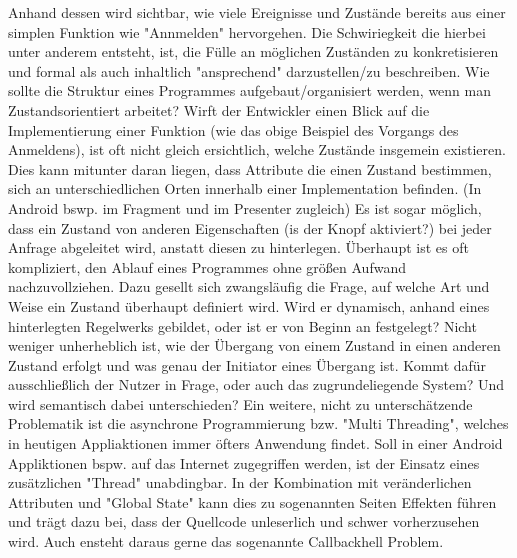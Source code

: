 Anhand dessen wird sichtbar, wie viele Ereignisse und Zustände bereits aus einer simplen Funktion wie "Annmelden" hervorgehen.
Die Schwiriegkeit die hierbei unter anderem entsteht, ist, die Fülle an möglichen Zuständen zu konkretisieren und 
formal als auch inhaltlich "ansprechend" darzustellen/zu beschreiben.
Wie sollte die Struktur eines Programmes aufgebaut/organisiert werden, wenn man Zustandsorientiert arbeitet?
Wirft der Entwickler einen Blick auf die Implementierung  einer Funktion (wie das obige Beispiel des Vorgangs des Anmeldens), 
ist oft nicht gleich ersichtlich, welche Zustände insgemein existieren.
Dies kann mitunter daran liegen, dass Attribute die einen Zustand bestimmen, sich an unterschiedlichen Orten innerhalb
einer Implementation befinden. (In Android bswp. im Fragment und im Presenter zugleich)
Es ist sogar möglich, dass ein Zustand von anderen Eigenschaften (is der Knopf aktiviert?) bei jeder Anfrage abgeleitet wird,
anstatt diesen zu hinterlegen.
Überhaupt ist es oft kompliziert, den Ablauf eines Programmes ohne größen Aufwand nachzuvollziehen.
Dazu gesellt sich zwangsläufig die Frage, auf welche Art und Weise ein Zustand überhaupt definiert wird. 
Wird er dynamisch, anhand eines hinterlegten Regelwerks gebildet, oder ist er von Beginn an festgelegt?
Nicht weniger unherheblich ist, wie der Übergang von einem Zustand in einen anderen Zustand erfolgt und was 
genau der Initiator eines Übergang ist.
Kommt dafür ausschließlich der Nutzer in Frage, oder auch das zugrundeliegende System? Und wird semantisch dabei unterschieden? 
Ein weitere, nicht zu unterschätzende Problematik ist die asynchrone Programmierung bzw. "Multi Threading",
welches in heutigen Appliaktionen immer öfters Anwendung findet. Soll in einer Android Appliktionen bspw. auf das Internet
zugegriffen werden, ist der Einsatz eines zusätzlichen "Thread" un­ab­ding­bar.
In der Kombination mit veränderlichen Attributen und "Global State" kann dies zu sogenannten Seiten Effekten führen und trägt dazu bei, 
dass der Quellcode unleserlich und schwer vorherzusehen wird. 
Auch ensteht daraus gerne das sogenannte Callbackhell Problem.




% 




